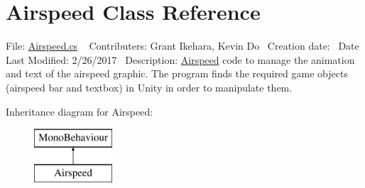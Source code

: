 \hypertarget{class_airspeed}{}\section{Airspeed Class Reference}
\label{class_airspeed}


File\+: \hyperlink{_airspeed_8cs}{Airspeed.\+cs} ~\newline
Contributers\+: Grant Ikehara, Kevin Do~\newline
Creation date\+:~\newline
Date Last Modified\+: 2/26/2017~\newline
Description\+: \hyperlink{class_airspeed}{Airspeed} code to manage the animation and text of the airspeed graphic. The program finds the required game objects (airspeed bar and textbox) in Unity in order to manipulate them.  


Inheritance diagram for Airspeed\+:\begin{figure}[H]
\begin{center}
\leavevmode
\includegraphics[height=2.000000cm]{class_airspeed}
\end{center}
\end{figure}
